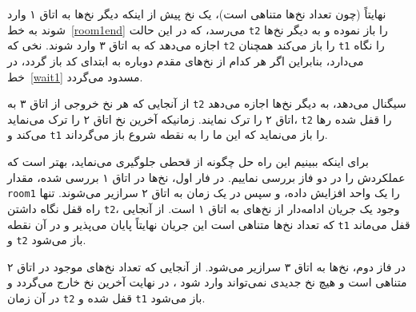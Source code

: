 \documentclass{book}
\begin{document}
    نهایتاً (چون تعداد نخ‌ها متناهی است)، یک نخ پیش از اینکه دیگر نخ‌ها به اتاق ۱ وارد شوند به خط~\ref{room1end} می‌رسد، که در این حالت {\tt t2}
    را باز نموده و به دیگر نخ‌ها اجازه می‌دهد که به اتاق ۳ وارد شوند. نخی که  {\tt t2}  را باز می‌کند همچنان  {\tt t1} را نگاه می‌دارد، بنابراین 
    اگر هر کدام از نخ‌های مقدم دوباره به ابتدای کد باز گردد، در خط~\ref{wait1} مسدود می‌گردد. 

    از آنجایی که هر نخ خروجی از اتاق ۳ به  {\tt t2} سیگنال می‌دهد،  به دیگر نخ‌ها اجازه می‌دهد اتاق ۲ را ترک نمایند. 
    زمانیکه آخرین نخ اتاق ۲ را ترک می‌نماید، {\tt t2}  را قفل شده رها می‌کند و  {\tt t1} را باز می‌نماید که این ما را به نقطه شروع باز می‌گرداند. 


    برای اینکه ببینیم این راه حل چگونه از قحطی جلوگیری می‌نماید، بهتر است که عملکردش را در دو فاز بررسی نماییم. 
    در فار اول، نخ‌ها در اتاق ۱ بررسی شده، مقدار {\tt room1} را یک واحد افزایش داده، و سپس در یک زمان به اتاق ۲ سرازیر می‌شوند. 
    تنها راه قفل نگاه داشتن  {\tt t2}، وجود یک جریان ادامه‌دار از نخ‌های به اتاق ۱ است. 
    از آنجایی که تعداد نخ‌ها متناهی است این جریان نهایتاً پایان می‌پذیر و در آن نقطه {\tt t1} قفل می‌ماند و  {\tt t2} باز می‌شود. 
    
    در فاز دوم، نخ‌ها به اتاق ۳ سرازیر می‌شود. از آنجایی که تعداد نخ‌های موجود در اتاق ۲ متناهی است و هیچ نخ جدیدی نمی‌تواند وارد شود ، 
    در نهایت آخرین نخ خارج می‌گردد و در آن زمان  {\tt t2} قفل شده و  {\tt t1} باز می‌شود. 
\end{document}
